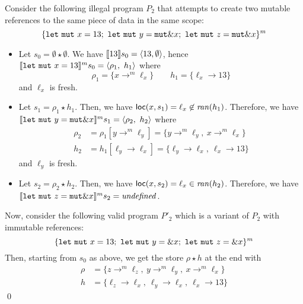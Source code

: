 \begin{example}
  Consider the following illegal program $P_2$
  that attempts to create two mutable references
  to the same piece of data in the same scope:
  \[
    \{
      \mathtt{let\ mut}\ x = 13;\
      \mathtt{let\ mut}\ y = \mathtt{mut}\borrow x;\
      \mathtt{let\ mut}\ z = \mathtt{mut}\borrow x
    \}^m
  \]
  \begin{itemize}
    \item Let $s_0=\emptyset \star \emptyset$.
    We have $\den[13]{s_0} = \langle 13,\emptyset\rangle$, hence
    $\denl[\mathtt{let\ mut}\ x = 13]{m}{s_0} =
    \langle \rho_1,\ h_1\rangle$ where
    \[\rho_1=\{x\to^m\ell_x\} \qquad
    h_1 = \{\ell_x\to 13\}\]
    and $\ell_x$ is fresh.
    \item Let $s_1 = \rho_1 \star h_1$.
    Then, we have
    $\loc(x,s_1) = \ell_x \not\in\ran(h_1)$.
    Therefore, we have
    $\denl[\mathtt{let\ mut}\ y = \mathtt{mut}\borrow x]{m}{s_1} =
    \langle \rho_2,\ h_2\rangle$
    where
    \begin{align*}
      \rho_2 & = \rho_1[y\to^m\ell_y] = \{y\to^m\ell_y,\ x\to^m\ell_x\}\\
      h_2 & = h_1[\ell_y\to \ell_x] =
      \{\ell_y\to \ell_x,\ \ell_x\to 13\}
    \end{align*}
    and $\ell_y$ is fresh.
    \item Let $s_2 = \rho_2 \star h_2$.
    Then, we have $\loc(x,s_2) = \ell_x \in\ran(h_2)$.
    Therefore, we have
    $\denl[\mathtt{let\ mut}\ z = \mathtt{mut}\borrow x]{m}{s_2} =
    \mathit{undefined}$.
  \end{itemize}
  Now, consider the following valid program $P'_2$ which is a variant
  of $P_2$ with immutable references:
  \[
    \{
      \mathtt{let\ mut}\ x = 13;\
      \mathtt{let\ mut}\ y = \borrow x;\
      \mathtt{let\ mut}\ z = \borrow x
    \}^m
  \]
  Then, starting from $s_0$ as above, we get the store $\rho\star h$
  at the end with
  \begin{align*}
      \rho & = \{z\to^m\ell_z,\ y\to^m\ell_y,\ x\to^m\ell_x\}\\
      h & = \{\ell_z\to \ell_x,\ \ell_y\to \ell_x,\ \ell_x\to 13\}
    \end{align*}
    \qed
\end{example}

